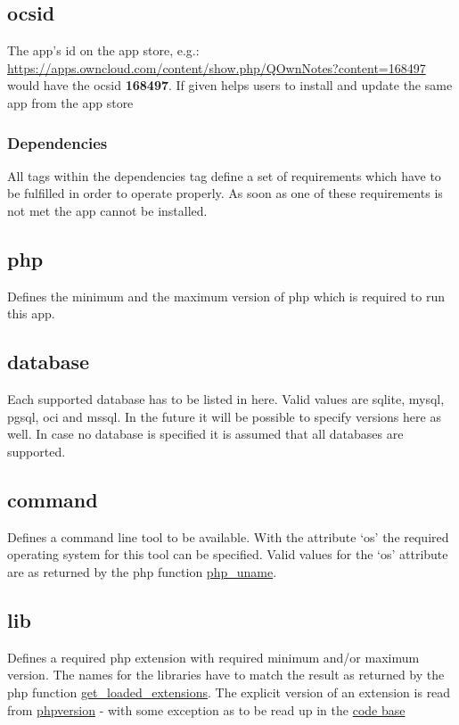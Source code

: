 \documentclass[letterpaper,10pt,english]{sphinxmanual}
\begin{document}
\subsection{ocsid}
\label{app/info:ocsid}
The app's id on the app store, e.g.: \href{https://apps.owncloud.com/content/show.php/QOwnNotes?content=168497}{https://apps.owncloud.com/content/show.php/QOwnNotes?content=168497} would have the ocsid \textbf{168497}. If given helps users to install and update the same app from the app store


\subsubsection{Dependencies}
\label{app/info:dependencies}
All tags within the dependencies tag define a set of requirements which have to be fulfilled in order to operate
properly. As soon as one of these requirements is not met the app cannot be installed.


\subsection{php}
\label{app/info:php}
Defines the minimum and the maximum version of php which is required to run this app.


\subsection{database}
\label{app/info:database}
Each supported database has to be listed in here. Valid values are sqlite, mysql, pgsql, oci and mssql. In the future
it will be possible to specify versions here as well.
In case no database is specified it is assumed that all databases are supported.


\subsection{command}
\label{app/info:command}
Defines a command line tool to be available. With the attribute `os' the required operating system for this tool can be
specified. Valid values for the `os' attribute are as returned by the php function \href{http://php.net/manual/en/function.php-uname.php}{php\_uname}.


\subsection{lib}
\label{app/info:lib}
Defines a required php extension with required minimum and/or maximum version. The names for the libraries have to match the result as returned by the php function  \href{http://php.net/manual/en/function.get-loaded-extensions.php}{get\_loaded\_extensions}.
The explicit version of an extension is read from \href{http://php.net/manual/de/function.phpversion.php}{phpversion} - with some exception as to be read up in the \href{https://github.com/owncloud/core/blob/master/lib/private/app/platformrepository.php\#L45}{code base}
\end{document}
